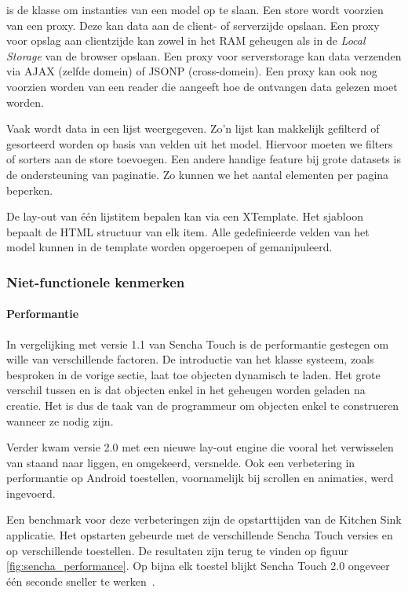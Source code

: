  is de klasse om instanties van een model op te slaan.  Een store wordt voorzien van een proxy.  Deze kan data aan de client- of serverzijde opslaan.  Een proxy voor opslag aan clientzijde kan zowel in het RAM geheugen als in de \emph{Local Storage} van de browser opslaan.  Een proxy voor serverstorage kan data verzenden via AJAX (zelfde domein) of JSONP (cross-domein).  Een proxy kan ook nog voorzien worden van een reader die aangeeft hoe de ontvangen data gelezen moet worden.

Vaak wordt data in een lijst weergegeven.  Zo'n lijst kan makkelijk gefilterd of gesorteerd worden op basis van velden uit het model.  Hiervoor moeten we filters of sorters aan de store toevoegen.  Een andere handige feature bij grote datasets is de ondersteuning van paginatie.  Zo kunnen we het aantal elementen per pagina beperken.  

De lay-out van één lijstitem bepalen kan via een XTemplate.  Het sjabloon bepaalt de HTML structuur van elk item.  Alle gedefinieerde velden van het model kunnen in de template worden opgeroepen of gemanipuleerd.

\subsubsection{Niet-functionele kenmerken}
\paragraph{Performantie}
In vergelijking met versie 1.1 van Sencha Touch is de performantie gestegen om wille van verschillende factoren.  De introductie van het klasse systeem,  zoals besproken in de vorige sectie,  laat toe objecten dynamisch te laden.  Het grote verschil tussen  en  is dat objecten enkel in het geheugen worden geladen na creatie.  Het is dus de taak van de programmeur om objecten enkel te construeren wanneer ze nodig zijn.

Verder kwam versie 2.0 met een nieuwe lay-out engine die vooral het verwisselen van staand naar liggen,  en omgekeerd,  versnelde.  Ook een verbetering in performantie op Android toestellen,  voornamelijk bij scrollen en animaties,  werd ingevoerd.

Een benchmark voor deze verbeteringen zijn de opstarttijden van de Kitchen Sink applicatie.  Het opstarten gebeurde met de verschillende Sencha Touch versies en op verschillende toestellen.  De resultaten zijn terug te vinden op figuur \ref{fig:sencha_performance}.  Op bijna elk toestel blijkt Sencha Touch 2.0 ongeveer één seconde sneller te werken~\cite{SenchaInc.2013}.

